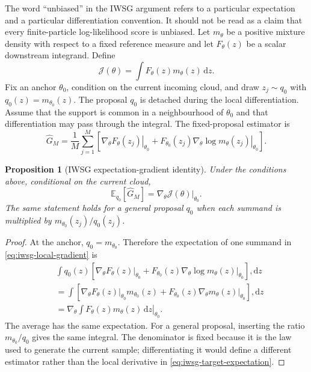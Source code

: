 \documentclass[11pt]{article}
\newtheorem{proposition}{Proposition}
\newcommand{\dd}{\mathrm{d}}
\begin{document}
The word ``unbiased'' in the IWSG argument refers to a particular expectation
and a particular differentiation convention. It should not be read as a
claim that every finite-particle log-likelihood score is unbiased. Let
$m_\theta$ be a positive mixture density with respect to a fixed reference
measure and let $F_\theta(z)$ be a scalar downstream integrand. Define
\begin{equation}
 \mathcal J(\theta)
   =\int F_\theta(z)m_\theta(z)\,\dd z.
 \label{eq:iwsg-target-expectation}
\end{equation}
Fix an anchor $\theta_0$, condition on the current incoming cloud, and draw
$z_j\sim q_0$ with $q_0(z)=m_{\theta_0}(z)$. The proposal $q_0$ is detached
during the local differentiation. Assume that the support is common in a
neighbourhood of $\theta_0$ and that differentiation may pass through the
integral. The fixed-proposal estimator is
\begin{equation}
 \widehat G_M
 =\frac1M\sum_{j=1}^M
   \left[
      \left.\nabla_\theta F_\theta(z_j)\right|_{\theta_0}
      +F_{\theta_0}(z_j)
       \left.\nabla_\theta\log m_\theta(z_j)\right|_{\theta_0}
   \right].
 \label{eq:iwsg-local-gradient}
\end{equation}

\begin{proposition}[IWSG expectation-gradient identity]
\label{prop:iwsg-expectation-gradient}
Under the conditions above, conditional on the current cloud,
\begin{equation}
 \mathbb E_{q_0}[\widehat G_M]
 =\left.\nabla_\theta\mathcal J(\theta)\right|_{\theta_0}.
 \label{eq:iwsg-unbiased-expectation-gradient}
\end{equation}
The same statement holds for a general proposal $q_0$ when each summand is
multiplied by $m_{\theta_0}(z_j)/q_0(z_j)$.
\end{proposition}

\begin{proof}
At the anchor, $q_0=m_{\theta_0}$. Therefore the expectation of one summand
in \eqref{eq:iwsg-local-gradient} is
\begin{align*}
 &\int q_0(z)\left[
      \left.\nabla_\theta F_\theta(z)\right|_{\theta_0}
      +F_{\theta_0}(z)
       \left.\nabla_\theta\log m_\theta(z)\right|_{\theta_0}
    \right],\dd z \\
 &=\int\left[
      \left.\nabla_\theta F_\theta(z)\right|_{\theta_0}m_{\theta_0}(z)
      +F_{\theta_0}(z)
       \left.\nabla_\theta m_\theta(z)\right|_{\theta_0}
    \right],\dd z \\
 &=\left.\nabla_\theta\int F_\theta(z)m_\theta(z)\,\dd z\right|_{\theta_0}.
\end{align*}
The average has the same expectation. For a general proposal, inserting the
ratio $m_{\theta_0}/q_0$ gives the same integral. The denominator is fixed
because it is the law used to generate the current sample; differentiating it
would define a different estimator rather than the local derivative in
\eqref{eq:iwsg-target-expectation}.
\end{proof}
\end{document}
